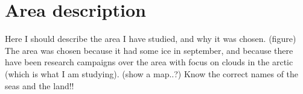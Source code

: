 \section{Area description}
Here I should describe the area I have studied, and why it was chosen. (figure)
The area was chosen because it had some ice in september, and because there have been research campaigns over the area with focus on clouds in the arctic (which is what I am studying). (show a map..?) Know the correct names of the seas and the land!!